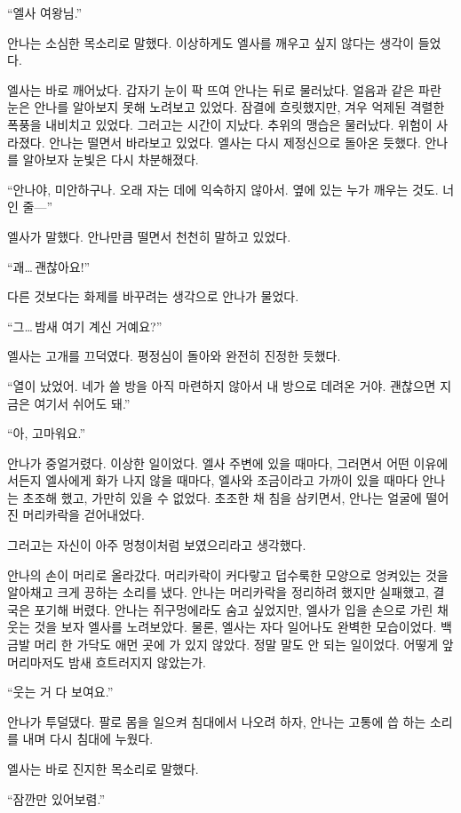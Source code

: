 ``엘사 여왕님.''

안나는 소심한 목소리로 말했다. 이상하게도 엘사를 깨우고 싶지 않다는 생각이 들었다.

엘사는 바로 깨어났다. 갑자기 눈이 팍 뜨여 안나는 뒤로 물러났다. 얼음과 같은 파란 눈은 안나를 알아보지 못해 노려보고 있었다. 잠결에 흐릿했지만, 겨우 억제된 격렬한 폭풍을 내비치고 있었다. 그러고는 시간이 지났다. 추위의 맹습은 물러났다. 위험이 사라졌다. 안나는 떨면서 바라보고 있었다. 엘사는 다시 제정신으로 돌아온 듯했다. 안나를 알아보자 눈빛은 다시 차분해졌다.

``안나야, 미안하구나. 오래 자는 데에 익숙하지 않아서. 옆에 있는 누가 깨우는 것도. 너인 줄—''

엘사가 말했다. 안나만큼 떨면서 천천히 말하고 있었다.

``괘\ldots\,괜찮아요!''

다른 것보다는 화제를 바꾸려는 생각으로 안나가 물었다.

``그\ldots\,밤새 여기 계신 거예요?''

엘사는 고개를 끄덕였다. 평정심이 돌아와 완전히 진정한 듯했다.

``열이 났었어. 네가 쓸 방을 아직 마련하지 않아서 내 방으로 데려온 거야. 괜찮으면 지금은 여기서 쉬어도 돼.''

``아, 고마워요.''

안나가 중얼거렸다. 이상한 일이었다. 엘사 주변에 있을 때마다, 그러면서 어떤 이유에서든지 엘사에게 화가 나지 않을 때마다, 엘사와 조금이라고 가까이 있을 때마다 안나는 초조해 했고, 가만히 있을 수 없었다. 초조한 채 침을 삼키면서, 안나는 얼굴에 떨어진 머리카락을 걷어내었다.

그러고는 자신이 아주 멍청이처럼 보였으리라고 생각했다.

안나의 손이 머리로 올라갔다. 머리카락이 커다랗고 덥수룩한 모양으로 엉켜있는 것을 알아채고 크게 끙하는 소리를 냈다. 안나는 머리카락을 정리하려 했지만 실패했고, 결국은 포기해 버렸다. 안나는 쥐구멍에라도 숨고 싶었지만, 엘사가 입을 손으로 가린 채 웃는 것을 보자 엘사를 노려보았다. 물론, 엘사는 자다 일어나도 완벽한 모습이었다. 백금발 머리 한 가닥도 애먼 곳에 가 있지 않았다. 정말 말도 안 되는 일이었다. 어떻게 앞머리마저도 밤새 흐트러지지 않았는가.

``웃는 거 다 보여요.''

안나가 투덜댔다. 팔로 몸을 일으켜 침대에서 나오려 하자, 안나는 고통에 씁 하는 소리를 내며 다시 침대에 누웠다.

엘사는 바로 진지한 목소리로 말했다.

``잠깐만 있어보렴.''

